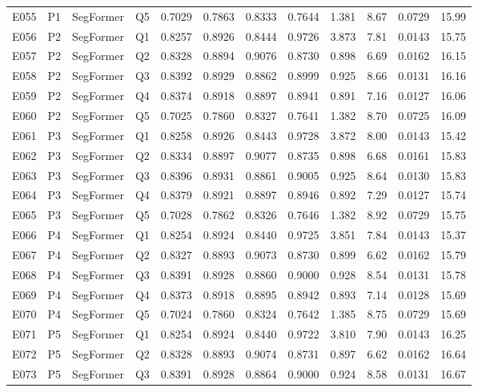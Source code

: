 \begin{longtable}{@{}lllllccccccc@{}}
E055 & P1 & SegFormer & Q5 & 0.7029 & 0.7863 & 0.8333 & 0.7644 & 1.381 & 8.67 & 0.0729 & 15.99 \\
E056 & P2 & SegFormer & Q1 & 0.8257 & 0.8926 & 0.8444 & 0.9726 & 3.873 & 7.81 & 0.0143 & 15.75 \\
E057 & P2 & SegFormer & Q2 & 0.8328 & 0.8894 & 0.9076 & 0.8730 & 0.898 & 6.69 & 0.0162 & 16.15 \\
E058 & P2 & SegFormer & Q3 & 0.8392 & 0.8929 & 0.8862 & 0.8999 & 0.925 & 8.66 & 0.0131 & 16.16 \\
E059 & P2 & SegFormer & Q4 & 0.8374 & 0.8918 & 0.8897 & 0.8941 & 0.891 & 7.16 & 0.0127 & 16.06 \\
E060 & P2 & SegFormer & Q5 & 0.7025 & 0.7860 & 0.8327 & 0.7641 & 1.382 & 8.70 & 0.0725 & 16.09 \\
E061 & P3 & SegFormer & Q1 & 0.8258 & 0.8926 & 0.8443 & 0.9728 & 3.872 & 8.00 & 0.0143 & 15.42 \\
E062 & P3 & SegFormer & Q2 & 0.8334 & 0.8897 & 0.9077 & 0.8735 & 0.898 & 6.68 & 0.0161 & 15.83 \\
E063 & P3 & SegFormer & Q3 & 0.8396 & 0.8931 & 0.8861 & 0.9005 & 0.925 & 8.64 & 0.0130 & 15.83 \\
E064 & P3 & SegFormer & Q4 & 0.8379 & 0.8921 & 0.8897 & 0.8946 & 0.892 & 7.29 & 0.0127 & 15.74 \\
E065 & P3 & SegFormer & Q5 & 0.7028 & 0.7862 & 0.8326 & 0.7646 & 1.382 & 8.92 & 0.0729 & 15.75 \\
E066 & P4 & SegFormer & Q1 & 0.8254 & 0.8924 & 0.8440 & 0.9725 & 3.851 & 7.84 & 0.0143 & 15.37 \\
E067 & P4 & SegFormer & Q2 & 0.8327 & 0.8893 & 0.9073 & 0.8730 & 0.899 & 6.62 & 0.0162 & 15.79 \\
E068 & P4 & SegFormer & Q3 & 0.8391 & 0.8928 & 0.8860 & 0.9000 & 0.928 & 8.54 & 0.0131 & 15.78 \\
E069 & P4 & SegFormer & Q4 & 0.8373 & 0.8918 & 0.8895 & 0.8942 & 0.893 & 7.14 & 0.0128 & 15.69 \\
E070 & P4 & SegFormer & Q5 & 0.7024 & 0.7860 & 0.8324 & 0.7642 & 1.385 & 8.75 & 0.0729 & 15.69 \\
E071 & P5 & SegFormer & Q1 & 0.8254 & 0.8924 & 0.8440 & 0.9722 & 3.810 & 7.90 & 0.0143 & 16.25 \\
E072 & P5 & SegFormer & Q2 & 0.8328 & 0.8893 & 0.9074 & 0.8731 & 0.897 & 6.62 & 0.0162 & 16.64 \\
E073 & P5 & SegFormer & Q3 & 0.8391 & 0.8928 & 0.8864 & 0.9000 & 0.924 & 8.58 & 0.0131 & 16.67 \\

\end{longtable}
